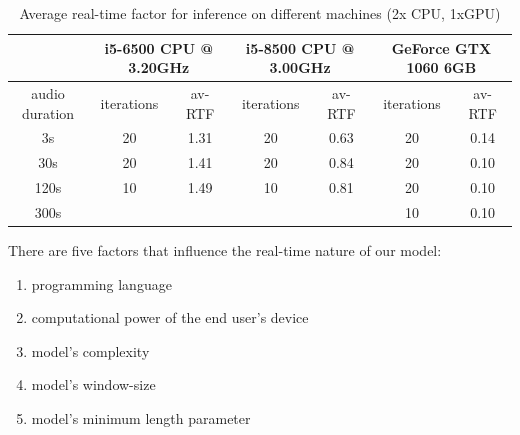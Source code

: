 \documentclass[bsc,frontabs,parskip,deptreport]{infthesis}
\begin{document}
\begin{table}[]
    \hspace{-2cm}
    \begin{tabular}{|c|c|c|c|c|c|c|}
    \hline
    & \multicolumn{2}{|c|}{i5-6500 CPU @ 3.20GHz} &
    \multicolumn{2}{|c|}{i5-8500 CPU @ 3.00GHz} & 
    \multicolumn{2}{|c|}{GeForce GTX 1060 6GB} \\ 
    \hline
    audio duration & iterations & av-RTF &
    iterations & av-RTF & iterations & av-RTF \\
    \hline
    3s & 20 & 1.31   & 20 & 0.63  & 20 & 0.14  \\
    30s & 20 & 1.41  & 20 & 0.84  & 20 & 0.10 \\
    120s & 10 & 1.49 &  10 & 0.81  & 20 & 0.10 \\
    300s &&&&                     & 10 & 0.10 \\
    \hline
    \end{tabular}
    \caption{Average real-time factor for inference on different machines (2x CPU, 1xGPU)}
    \label{tab:rtf}
\end{table}


There are five factors that influence the real-time nature of our model:
\begin{enumerate}
    \item programming language
    \item computational power of the end user's device
    \item model's complexity
    \item model's window-size
    \item model's minimum length parameter 
\end{enumerate}
\end{document}

